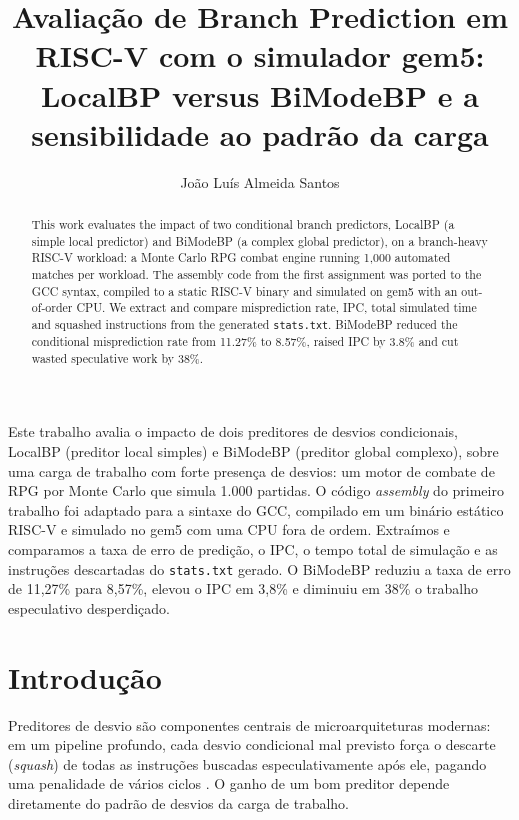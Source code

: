 \documentclass[12pt]{article}
\title{Avaliação de Branch Prediction em RISC-V com o simulador gem5:\\
LocalBP versus BiModeBP e a sensibilidade ao padrão da carga}
\author{João Luís Almeida Santos\inst{1}}
\begin{document}
\maketitle

\begin{abstract}
  This work evaluates the impact of two conditional branch predictors,
  LocalBP (a simple local predictor) and BiModeBP (a complex global
  predictor), on a branch-heavy RISC-V workload: a Monte Carlo RPG combat
  engine running 1{,}000 automated matches per workload. The assembly code from the
  first assignment was ported to the GCC syntax, compiled to a static
  RISC-V binary and simulated on gem5 with an out-of-order CPU. We extract
  and compare misprediction rate, IPC, total simulated time and squashed
  instructions from the generated \texttt{stats.txt}. BiModeBP reduced the
  conditional misprediction rate from 11.27\% to 8.57\%, raised IPC by
  3.8\% and cut wasted speculative work by 38\%.
\end{abstract}

\begin{resumo}
  Este trabalho avalia o impacto de dois preditores de desvios
  condicionais, LocalBP (preditor local simples) e BiModeBP (preditor
  global complexo), sobre uma carga de trabalho com forte presença de
  desvios: um motor de combate de RPG por Monte Carlo que simula
  1.000 partidas. O código \emph{assembly} do primeiro trabalho foi
  adaptado para a sintaxe do GCC, compilado em um binário estático
  RISC-V e simulado no gem5 com uma CPU fora de ordem. Extraímos e
  comparamos a taxa de erro de predição, o IPC, o tempo total de
  simulação e as instruções descartadas do \texttt{stats.txt} gerado.
  O BiModeBP reduziu a taxa de erro de 11,27\% para 8,57\%, elevou o
  IPC em 3,8\% e diminuiu em 38\% o trabalho especulativo desperdiçado.
\end{resumo}

\section{Introdução}

Preditores de desvio são componentes centrais de microarquiteturas
modernas: em um pipeline profundo, cada desvio condicional mal previsto
força o descarte (\emph{squash}) de todas as instruções buscadas
especulativamente após ele, pagando uma penalidade de vários ciclos
\cite{hennessy2017quantitative}. O ganho de um bom preditor depende
diretamente do padrão de desvios da carga de trabalho.
\end{document}
